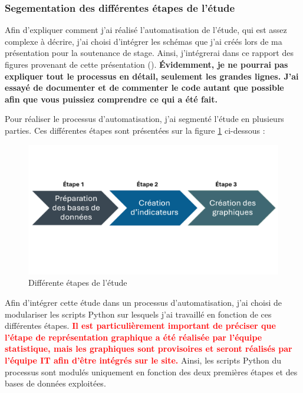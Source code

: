 \documentclass[12pt]{article}
\begin{document}
\subsubsection{Segementation des différentes étapes de l'étude}

Afin d'expliquer comment j'ai réalisé l'automatisation de l'étude, qui est assez complexe à décrire, 
j'ai choisi d'intégrer les schémas que j'ai créés lors de ma présentation pour la soutenance de stage. 
Ainsi, j'intégrerai dans ce rapport des figures provenant de cette présentation (\cite{beamer}).
\textbf{Évidemment, je ne pourrai pas expliquer tout le processus en détail, seulement les grandes lignes. 
J'ai essayé de documenter et de commenter le code autant que possible afin que vous puissiez 
comprendre ce qui a été fait.} \newline


Pour réaliser le processus d'automatisation, j'ai segmenté l'étude en plusieurs parties.
Ces différentes étapes sont présentées sur la figure \ref{fig:seg} ci-dessous :
\begin{figure}[H]
    \centering
    \includegraphics[width=\textwidth]{etape.png}
    \caption{ Différente étapes de l'étude \cite{beamer}}
    \label{fig:seg}
\end{figure}

Afin d'intégrer cette étude dans un processus d'automatisation, j'ai choisi de modulariser les 
scripts Python sur lesquels j'ai travaillé en fonction de ces différentes étapes. 
\textbf{\textcolor{red}{Il est particulièrement important de préciser que l'étape de représentation graphique 
a été réalisée par l'équipe statistique, mais les graphiques sont provisoires et seront 
réalisés par l'équipe IT afin d'être intégrés sur le site.}} Ainsi, les scripts Python du 
processus sont modulés uniquement en fonction des deux premières étapes et des bases de données exploitées.\newline
\end{document}
